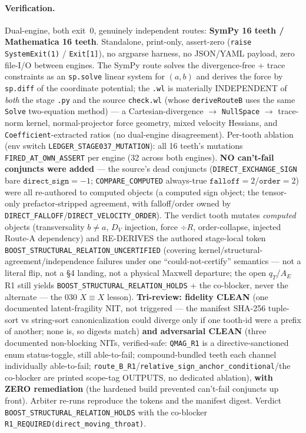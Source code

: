 \paragraph{Verification.}
Dual-engine, both exit~0, genuinely independent routes: \textbf{SymPy 16
teeth / Mathematica 16 teeth}. Standalone, print-only, assert-zero
(\texttt{raise SystemExit(1)} / \texttt{Exit[1]}), no argparse harness, no
JSON/YAML payload, zero file-I/O between engines. The SymPy route solves
the divergence-free + trace constraints as an \texttt{sp.solve} linear
system for \((a,b)\) and derives the force by \texttt{sp.diff} of the
coordinate potential; the \texttt{.wl} is materially INDEPENDENT of
\emph{both} the stage \texttt{.py} and the source \texttt{check.wl} (whose
\texttt{deriveRouteB} uses the same \texttt{Solve} two-equation method) ---
a Cartesian-divergence \(\to\) \texttt{NullSpace} \(\to\) trace-norm kernel,
normal-projector force geometry, mixed velocity Hessians, and
\texttt{Coefficient}-extracted ratios (no dual-engine disagreement).
Per-tooth ablation (env switch \texttt{LEDGER\_STAGE037\_MUTATION}): all 16
teeth's mutations \texttt{FIRED\_AT\_OWN\_ASSERT} per engine (32 across both
engines). \textbf{NO can't-fail conjuncts were added} --- the source's
dead conjuncts (\texttt{DIRECT\_EXCHANGE\_SIGN} bare \(\texttt{direct\_sign}{=}{-}1\);
\texttt{COMPARE\_COMPUTED} always-true \(\texttt{falloff}{=}2\)/\(\texttt{order}{=}2\))
were all re-authored to computed objects (a computed sign object; the
tensor-only prefactor-stripped agreement, with falloff/order owned by
\texttt{DIRECT\_FALLOFF}/\texttt{DIRECT\_VELOCITY\_ORDER}). The verdict tooth
mutates \emph{computed} objects (transversality \(b\neq a\), \(D_V\)
injection, force \(\div R\), order-collapse, injected Route-A dependency)
and RE-DERIVES the authored stage-local token
\texttt{BOOST\_STRUCTURAL\_RELATION\_UNCERTIFIED} (covering
kernel/structural-agreement/independence failures under one
``could-not-certify'' semantics --- not a literal flip, not a \S4 landing,
not a physical Maxwell departure; the open \(q_T\)/\(A_E\) R1 still yields
\texttt{BOOST\_STRUCTURAL\_RELATION\_HOLDS} + the co-blocker, never the
alternate --- the 030 \(X\equiv X\) lesson). \textbf{Tri-review: fidelity
CLEAN} (one documented latent-fragility NIT, not triggered --- the manifest
SHA-256 tuple-sort vs string-sort canonicalization could diverge only if
one tooth-id were a prefix of another; none is, so digests match)
\textbf{and adversarial CLEAN} (three documented non-blocking NITs,
verified-safe: \texttt{QMAG\_R1} is a directive-sanctioned enum
status-toggle, still able-to-fail; compound-bundled teeth each channel
individually able-to-fail; \texttt{route\_B\_R1}/\texttt{relative\_sign\_anchor\_conditional}/the
co-blocker are printed scope-tag OUTPUTS, no dedicated ablation),
\textbf{with ZERO remediation} (the hardened build prevented can't-fail
conjuncts up front). Arbiter re-runs reproduce the tokens and the manifest
digest. Verdict \texttt{BOOST\_STRUCTURAL\_RELATION\_HOLDS} with the
co-blocker \texttt{R1\_REQUIRED(direct\_moving\_throat)}.
